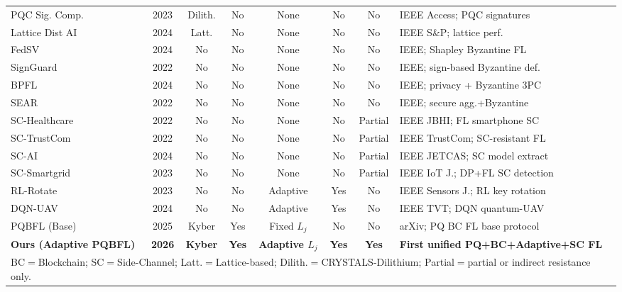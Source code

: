 \documentclass[journal, 10pt, twocolumn]{IEEEtran}
\begin{document}
\begin{table}[htbp]
\begin{tabularx}{\textwidth}{l c c c c c c X}
PQC Sig. Comp. \cite{comp_2}           & 2023 & Dilith.     & No  & None         & No  & No      & IEEE Access; PQC signatures \\
Lattice Dist AI \cite{comp_3}          & 2024 & Latt.       & No  & None         & No  & No      & IEEE S\&P; lattice perf. \\
FedSV \cite{fedsv}                     & 2024 & No          & No  & None         & No  & No      & IEEE; Shapley Byzantine FL \\
SignGuard \cite{signguard}             & 2022 & No          & No  & None         & No  & No      & IEEE; sign-based Byzantine def. \\
BPFL \cite{bpfl}                       & 2024 & No          & No  & None         & No  & No      & IEEE; privacy + Byzantine 3PC \\
SEAR \cite{sear}                       & 2022 & No          & No  & None         & No  & No      & IEEE; secure agg.+Byzantine \\
SC-Healthcare \cite{sc_healthcare}     & 2022 & No          & No  & None         & No  & Partial & IEEE JBHI; FL smartphone SC \\
SC-TrustCom \cite{sc_trustcom}         & 2022 & No          & No  & None         & No  & Partial & IEEE TrustCom; SC-resistant FL \\
SC-AI \cite{sc_trustworthy_ai}         & 2024 & No          & No  & None         & No  & Partial & IEEE JETCAS; SC model extract \\
SC-Smartgrid \cite{sc_smartgrid}       & 2023 & No          & No  & None         & No  & Partial & IEEE IoT J.; DP+FL SC detection \\
RL-Rotate \cite{rl_rotation1}          & 2023 & No          & No  & Adaptive     & Yes & No      & IEEE Sensors J.; RL key rotation \\
DQN-UAV \cite{qfl_uav}                 & 2024 & No          & No  & Adaptive     & Yes & No      & IEEE TVT; DQN quantum-UAV \\
PQBFL (Base) \cite{pqbfl1}             & 2025 & Kyber       & Yes & Fixed $L_j$  & No  & No      & arXiv; PQ BC FL base protocol \\
\midrule
\textbf{Ours (Adaptive PQBFL)} & \textbf{2026} & \textbf{Kyber} & \textbf{Yes} & \textbf{Adaptive $L_j$} & \textbf{Yes} & \textbf{Yes} & \textbf{First unified PQ+BC+Adaptive+SC FL} \\
\bottomrule
\multicolumn{8}{l}{\small BC$=$Blockchain; SC$=$Side-Channel; Latt.$=$Lattice-based; Dilith.$=$CRYSTALS-Dilithium; Partial$=$partial or indirect resistance only.}
\end{tabularx}
\end{table}
\end{document}
